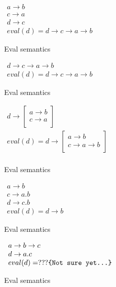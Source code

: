 \documentclass[11pt]{article}
\begin{document}
\begin{example}[H]
$
  \begin{array}{l}
    a \rightarrow b \\
    c \rightarrow a \\
    d \rightarrow c \\
    eval(d) = d \rightarrow c \rightarrow a \rightarrow b
  \end{array}
$
\caption{Eval semantics}
\end{example}

\begin{example}[H]
$
  \begin{array}{l}
    d \rightarrow c \rightarrow a \rightarrow b \\
    eval(d) = d \rightarrow c \rightarrow a \rightarrow b
  \end{array}
$
\caption{Eval semantics}
\end{example}

\begin{example}[H]
$
  \begin{array}{l}
    d \rightarrow
    \left [ \begin{array}{l}
      a \rightarrow b \\
      c \rightarrow a \\
    \end{array} \right ] \\
    eval(d) = d \rightarrow 
    \left [ \begin{array}{l}
      a \rightarrow b \\
      c \rightarrow a \rightarrow b \\
    \end{array} \right ] \\
  \end{array}
$
\caption{Eval semantics}
\end{example}

\begin{example}[H]
$
  \begin{array}{l}
    a \rightarrow b \\
    c \rightarrow a.b \\ 
    d \rightarrow c.b \\
    eval(d) = d \rightarrow b
  \end{array}
$
\caption{Eval semantics}
\end{example}

\begin{example}[H]
$
  \begin{array}{l}
    a \rightarrow b \rightarrow c\\
    d \rightarrow a.c \\
    eval(d) = ??? \texttt{\{Not sure yet\textellipsis\}}
  \end{array}
$
\caption{Eval semantics}
\end{example}
\end{document}
